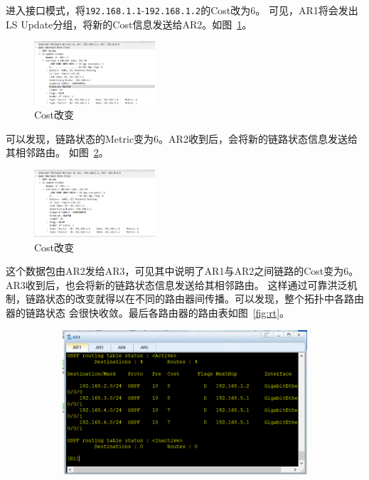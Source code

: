 \documentclass[a4paper,twoside]{article}
\begin{document}
\begin{spacing}{1.2}
进入接口模式，将\texttt{192.168.1.1}-\texttt{192.168.1.2}的Cost改为6。
可见，AR1将会发出LS Update分组，将新的Cost信息发送给AR2。如图~\ref{fig:costchange}。
\begin{figure}[htb]
	\centering
	\caption{Cost改变}
	\label{fig:costchange}
	\includegraphics[width=0.4\textwidth]{inccost.png}
\end{figure}
可以发现，链路状态的Metric变为6。AR2收到后，会将新的链路状态信息发送给其相邻路由。
如图~\ref{fig:costchange2}。
\begin{figure}[htb]
	\centering
	\caption{Cost改变}
	\label{fig:costchange2}
	\includegraphics[width=0.4\textwidth]{22lup.png}
\end{figure}
这个数据包由AR2发给AR3，可见其中说明了AR1与AR2之间链路的Cost变为6。AR3收到后，也会将新的链路状态信息发送给其相邻路由。
这样通过可靠洪泛机制，链路状态的改变就得以在不同的路由器间传播。可以发现，整个拓扑中各路由器的链路状态
会很快收敛。最后各路由器的路由表如图~\ref{fig:rt}。
\begin{figure}[bp]
	\centering
	\caption{各路由器的路由表}
	\label{fig:rt}
	\begin{subfigure}{0.4\textwidth}
		\centering
		\includegraphics[width=\textwidth]{ar1.png}

\end{subfigure}
\end{figure}
\end{spacing}
\end{document}
